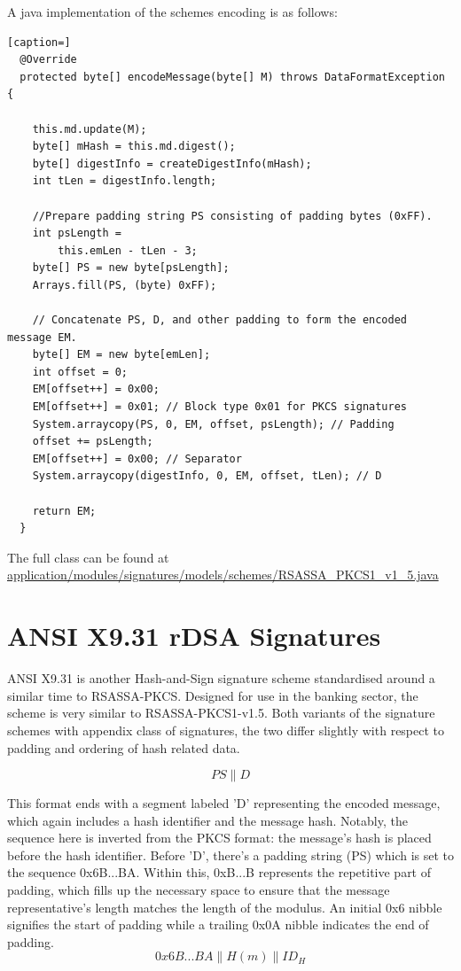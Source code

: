 \documentclass[]{final_report}
\theoremstyle{definition}
\begin{document}
A java implementation of the schemes encoding is as follows: 
\begin{lstlisting}[caption=]
  @Override
  protected byte[] encodeMessage(byte[] M) throws DataFormatException {

    this.md.update(M);
    byte[] mHash = this.md.digest();
    byte[] digestInfo = createDigestInfo(mHash);
    int tLen = digestInfo.length;
    
    //Prepare padding string PS consisting of padding bytes (0xFF).
    int psLength =
        this.emLen - tLen - 3;
    byte[] PS = new byte[psLength];
    Arrays.fill(PS, (byte) 0xFF);

    // Concatenate PS, D, and other padding to form the encoded message EM.
    byte[] EM = new byte[emLen];
    int offset = 0;
    EM[offset++] = 0x00; 
    EM[offset++] = 0x01; // Block type 0x01 for PKCS signatures
    System.arraycopy(PS, 0, EM, offset, psLength); // Padding
    offset += psLength;
    EM[offset++] = 0x00; // Separator
    System.arraycopy(digestInfo, 0, EM, offset, tLen); // D

    return EM;
  }
\end{lstlisting}
The full class can be found at \url{application/modules/signatures/models/schemes/RSASSA\_PKCS1\_v1\_5.java}

\section{ANSI X9.31 rDSA Signatures}
ANSI X9.31 \cite{ANSI-1998-X9-31} is another Hash-and-Sign signature scheme standardised around a similar time to RSASSA-PKCS. Designed for use in the banking sector, the scheme is very similar to RSASSA-PKCS1-v1.5. Both variants of the signature schemes with appendix class of signatures, the two differ slightly with respect to padding and ordering of hash related data.


\[PS\|D\]

This format ends with a segment labeled 'D' representing the encoded message, which again includes a hash identifier and the message hash. Notably, the sequence here is inverted from the PKCS format: the message's hash is placed before the hash identifier. Before 'D', there's a padding string (PS) which is set to the sequence 0x6B...BA. Within this, 0xB...B represents the repetitive part of padding, which fills up the necessary space to ensure that the message representative's length matches the length of the modulus. An initial 0x6 nibble signifies the start of padding while a trailing 0x0A nibble indicates the end of padding.
\[0x6B . . . BA\|H(m)\|ID_{H}\]
\end{document}
